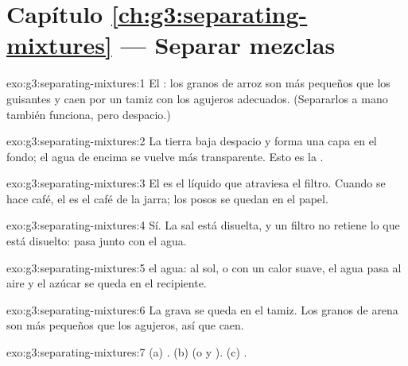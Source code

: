 \section*{Capítulo \ref{ch:g3:separating-mixtures} --- Separar mezclas}

\begin{solution}{exo:g3:separating-mixtures:1}
El : los granos de arroz son más pequeños que los guisantes y
caen por un tamiz con los agujeros adecuados. (Separarlos a mano
también funciona, pero despacio.)
\end{solution}

\begin{solution}{exo:g3:separating-mixtures:2}
La tierra baja despacio y forma una capa en el fondo; el agua de encima
se vuelve más transparente. Esto es la .
\end{solution}

\begin{solution}{exo:g3:separating-mixtures:3}
El  es el líquido que atraviesa el filtro. Cuando se hace café,
el  es el café de la jarra; los posos se quedan en el papel.
\end{solution}

\begin{solution}{exo:g3:separating-mixtures:4}
Sí. La sal está disuelta, y un filtro no retiene lo que está disuelto:
pasa junto con el agua.
\end{solution}

\begin{solution}{exo:g3:separating-mixtures:5}
 el agua: al sol, o con un calor suave, el agua pasa al aire
y el azúcar se queda en el recipiente.
\end{solution}

\begin{solution}{exo:g3:separating-mixtures:6}
La grava se queda en el tamiz. Los granos de arena son más pequeños que
los agujeros, así que caen.
\end{solution}

\begin{solution}{exo:g3:separating-mixtures:7}
(a) . (b)  (o  y ).
(c) .
\end{solution}

